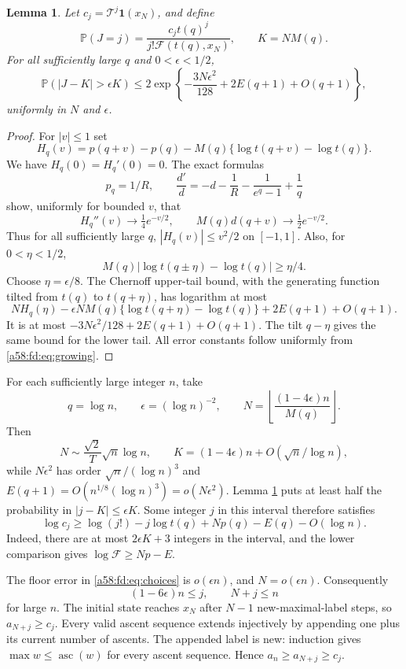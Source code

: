 \documentclass[11pt,letterpaper]{article}
\newtheorem{lemma}[theorem]{Lemma}
\theoremstyle{remark}
\newcommand{\asc}{\operatorname{asc}}
\newcommand{\TT}{\mathcal T}
\newcommand{\one}{\mathbf 1}
\newcommand{\Prb}{\mathbb P}
\begin{document}
\begin{lemma}\label{a58:fd:lem:concentration}
Let $c_j=\TT^j\one(x_N)$, and define
\[
 \Prb(J=j)=\frac{c_jt(q)^j}{j!\mathcal F(t(q),x_N)},\qquad K=NM(q).
\]
For all sufficiently large $q$ and $0<\epsilon<1/2$,
\begin{equation}\label{a58:fd:eq:chernoff}
 \Prb(|J-K|>\epsilon K)
 \le2\exp\left\{-\frac{3N\epsilon^2}{128}
                    +2E(q+1)+O(q+1)\right\},
\end{equation}
uniformly in $N$ and $\epsilon$.
\end{lemma}
\begin{proof}
For $|v|\le1$ set
\[
 H_q(v)=p(q+v)-p(q)-M(q)\{\log t(q+v)-\log t(q)\}.
\]
We have $H_q(0)=H_q'(0)=0$. The exact formulas
\[
 p_q=1/R,\qquad
 \frac{d'}d=-d-\frac1R-\frac1{e^q-1}+\frac1q
\]
show, uniformly for bounded $v$, that
\[
 H_q''(v)\longrightarrow\tfrac14e^{-v/2},\qquad
 M(q)d(q+v)\longrightarrow\tfrac12e^{-v/2}.
\]
Thus for all sufficiently large $q$, $|H_q(v)|\le v^2/2$ on $[-1,1]$. Also, for $0<\eta<1/2$,
\[
 M(q)|\log t(q\pm\eta)-\log t(q)|\ge\eta/4.
\]
Choose $\eta=\epsilon/8$. The Chernoff upper-tail bound, with the generating function tilted from $t(q)$ to $t(q+\eta)$, has logarithm at most
\[
 NH_q(\eta)-\epsilon NM(q)\{\log t(q+\eta)-\log t(q)\}
       +2E(q+1)+O(q+1).
\]
It is at most $-3N\epsilon^2/128+2E(q+1)+O(q+1)$. The tilt $q-\eta$ gives the same bound for the lower tail. All error constants follow uniformly from \eqref{a58:fd:eq:growing}.
\end{proof}

For each sufficiently large integer $n$, take
\begin{equation}\label{a58:fd:eq:choices}
 q=\log n,\qquad \epsilon=(\log n)^{-2},\qquad
 N=\left\lfloor\frac{(1-4\epsilon)n}{M(q)}\right\rfloor.
\end{equation}
Then
\[
 N\sim\frac{\sqrt2}{T}\sqrt n\log n,\qquad
 K=(1-4\epsilon)n+O(\sqrt n/\log n),
\]
while $N\epsilon^2$ has order $\sqrt n/(\log n)^3$ and
$E(q+1)=O(n^{1/8}(\log n)^3)=o(N\epsilon^2)$. Lemma \ref{a58:fd:lem:concentration} puts at least half the probability in $|j-K|\le\epsilon K$. Some integer $j$ in this interval therefore satisfies
\begin{equation}\label{a58:fd:eq:extract}
 \log c_j\ge\log(j!)-j\log t(q)+Np(q)-E(q)-O(\log n).
\end{equation}
Indeed, there are at most $2\epsilon K+3$ integers in the interval, and the lower comparison gives $\log\mathcal F\ge Np-E$.

The floor error in \eqref{a58:fd:eq:choices} is $o(\epsilon n)$, and $N=o(\epsilon n)$. Consequently
\[
 (1-6\epsilon)n\le j,\qquad N+j\le n
\]
for large $n$. The initial state reaches $x_N$ after $N-1$ new-maximal-label steps, so $a_{N+j}\ge c_j$. Every valid ascent sequence extends injectively by appending one plus its current number of ascents. The appended label is new: induction gives $\max w\le\asc(w)$ for every ascent sequence. Hence $a_n\ge a_{N+j}\ge c_j$.
\end{document}
